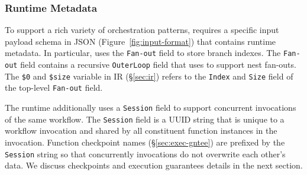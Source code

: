 \subsubsection{Runtime Metadata}

To support a rich variety of orchestration patterns, \name{} requires a
specific input payload schema in JSON (Figure~\ref{fig:input-format}) that
contains \name{} runtime metadata. In particular, \name{} uses the
\texttt{Fan-out} field to store branch indexes. The \texttt{Fan-out} field
contains a recursive \texttt{OuterLoop} field that \name{} uses to support
nest fan-outs. The \texttt{\$0} and \texttt{\$size} variable in
\name{} IR (\S\ref{sec:ir}) refers to the \texttt{Index}  and \texttt{Size}
field of the top-level \texttt{Fan-out} field.

The runtime additionally uses a \texttt{Session} field to support concurrent
invocations of the same workflow. The \texttt{Session} field is a UUID string
that is unique to a workflow invocation and shared by all constituent function
instances in the invocation. Function checkpoint names
(\S\ref{sec:exec-gntee}) are prefixed by the \texttt{Session} string so that
concurrently invocations do not overwrite each other's data. We discuss
\name{} checkpoints and execution guarantees details in the next section.